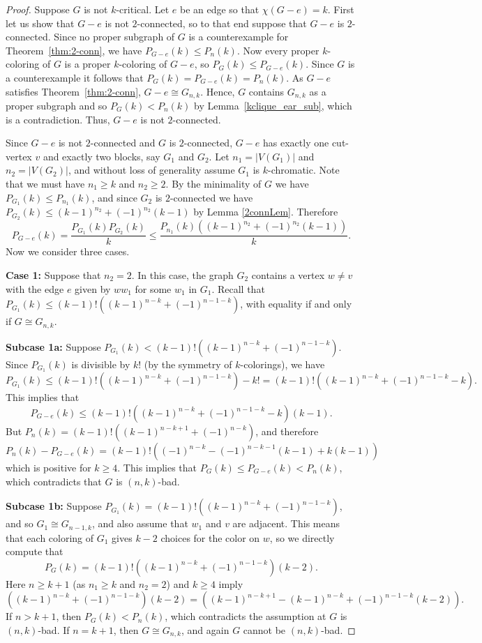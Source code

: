 \documentclass[11pt]{article}
\theoremstyle{plain}
\theoremstyle{definition}
\theoremstyle{remark}
\begin{document}
\begin{proof}
Suppose $G$ is not $k$-critical.  Let $e$ be an edge so that $\chi(G-e)=k$. First let us show that $G-e$ is not $2$-connected, so to that end suppose that $G-e$ is $2$-connected. Since no proper subgraph of $G$ is a counterexample for Theorem~\ref{thm:2-conn}, we have $P_{G-e}(k)\leq P_n(k)$. Now every proper $k$-coloring of $G$ is a proper $k$-coloring of $G-e$, so $P_G(k)\leq P_{G-e}(k)$. Since $G$ is a counterexample it follows that $P_G(k)= P_{G-e}(k)= P_n(k)$. As $G-e$ satisfies Theorem~\ref{thm:2-conn}, $G-e\cong G_{n,k}$. Hence, $G$ contains $G_{n,k}$ as a proper subgraph and so $P_G(k)<P_n(k)$ by Lemma~\ref{kclique_ear_sub}, which is a contradiction. Thus, $G-e$ is not $2$-connected.

Since $G-e$ is not $2$-connected and $G$ is $2$-connected, $G-e$ has exactly one cut-vertex $v$ and exactly two blocks, say $G_1$ and $G_2$. Let $n_1=|V(G_1)|$ and $n_2=|V(G_2)|$, and without loss of generality assume $G_1$ is $k$-chromatic. Note that we must have $n_1 \geq k$ and $n_2 \geq 2$.  By the minimality of $G$ we have $P_{G_1}(k)\leq P_{n_1}(k)$, and since $G_2$ is $2$-connected we have $P_{G_2}(k)\leq (k-1)^{n_2}+(-1)^{n_2}(k-1)$ by Lemma \ref{2connLem}. Therefore
$$P_{G-e}(k)=\frac{P_{G_1}(k)P_{G_2}(k)}{k}\leq \frac{P_{n_1}(k)\left((k-1)^{n_2}+(-1)^{n_2}(k-1)\right)}{k}.$$
Now we consider three cases.

\medskip

\textbf{Case 1:} Suppose that $n_2=2$.  In this case, the graph $G_2$ contains a vertex $w \neq v$ with the edge $e$ given by $ww_1$ for some $w_1$ in $G_1$. Recall that $P_{G_1}(k) \leq (k-1)!((k-1)^{n-k} + (-1)^{n-1-k})$, with equality if and only if $G\cong G_{n,k}$. 

\textbf{Subcase 1a:} Suppose $P_{G_1}(k)<(k-1)!((k-1)^{n-k}+(-1)^{n-1-k})$. Since $P_{G_1}(k)$ is divisible by $k!$ (by the symmetry of $k$-colorings), we have 
$$P_{G_1}(k) \leq (k-1)!((k-1)^{n-k}+(-1)^{n-1-k})-k! = (k-1)!((k-1)^{n-k}+(-1)^{n-1-k}-k).$$ 
This implies that 
\[
P_{G-e}(k) \leq (k-1)!((k-1)^{n-k} + (-1)^{n-1-k}-k)(k-1).
\]
But $P_n(k) = (k-1)!((k-1)^{n-k+1}+(-1)^{n-k})$, and therefore 
\[
P_{n}(k) - P_{G-e}(k) = (k-1)!((-1)^{n-k} - (-1)^{n-k-1}(k-1) + k(k-1))
\]
which is positive for $k \geq 4$.  This implies that $P_G(k) \leq P_{G-e}(k) < P_n(k)$, which contradicts that $G$ is $(n,k)$-bad.

\textbf{Subcase 1b:} Suppose $P_{G_1}(k) = (k-1)!((k-1)^{n-k}+(-1)^{n-1-k})$, and so $G_1\cong G_{n-1,k}$, and also assume that $w_1$ and $v$ are adjacent. This means that each coloring of $G_1$ gives $k-2$ choices for the color on $w$, so we directly compute that 
\[
P_{G}(k) = (k-1)!((k-1)^{n-k}+(-1)^{n-1-k})(k-2).
\]
Here $n \geq k+1$ (as $n_1 \geq k$ and $n_2 =2$) and $k \geq 4$ imply
\[
((k-1)^{n-k} + (-1)^{n-1-k})(k-2) = ((k-1)^{n-k+1}-(k-1)^{n-k}+(-1)^{n-1-k}(k-2)).
\]
If $n>k+1$, then $P_G(k)<P_n(k)$, which contradicts the assumption at $G$ is $(n,k)$-bad. If $n=k+1$, then $G\cong G_{n,k}$, and again $G$ cannot be $(n,k)$-bad.


\end{proof}
\end{document}
